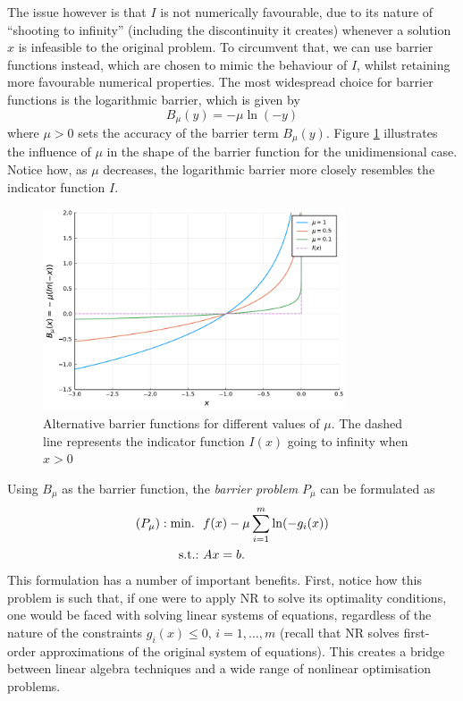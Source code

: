 The issue however is that $I$ is not numerically favourable, due to its nature of ``shooting to infinity'' (including the discontinuity it creates) whenever a solution $x$ is infeasible to the original problem. To circumvent that, we can use barrier functions instead, which are chosen to mimic the behaviour of $I$, whilst retaining more favourable numerical properties. The most widespread choice for barrier functions is the logarithmic barrier, which is given by
	\begin{equation*}
		B_\mu(y) = -\mu \ln(-y)
	\end{equation*}
	where $\mu > 0$ sets the accuracy of the barrier term $B_\mu(y)$. Figure \ref{p1c7:fig:barrier_function} illustrates the influence of $\mu$ in the shape of the barrier function for the unidimensional case. Notice how, as $\mu$ decreases, the logarithmic barrier more closely resembles the indicator function $I$.
	
\begin{figure}
	\includegraphics[width=0.8\textwidth]{chapters/chapter_7/figures/different_mu.pdf}
	\caption{Alternative barrier functions for different values of $\mu$. The dashed line represents the indicator function $I(x)$ going to infinity when $x > 0$} \label{p1c7:fig:barrier_function}
\end{figure}

Using $B_\mu$ as the barrier function, the \emph{barrier problem} $P_\mu$ can be formulated as
	\begin{align*}
		(P_\mu) : \mathop{\text{min.~}} \ &f(x) - \mu \sum_{i=1}^m\ln(-g_i(x)) \\
		\mathop{\text{s.t.:~}} & Ax = b.
	\end{align*}
	This formulation has a number of important benefits. First, notice how this problem is such that, if one were to apply NR to solve its optimality conditions, one would be faced with solving linear systems of equations, regardless of the nature of the constraints $g_i(x) \le 0$, $i = 1,\dots, m$ (recall that NR solves first-order approximations of the original system of equations). This creates a bridge between linear algebra techniques and a wide range of nonlinear optimisation problems. 
	
